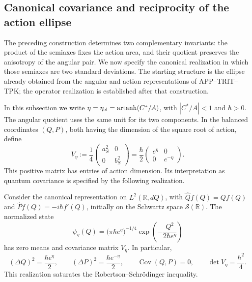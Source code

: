 
\subsection{Canonical covariance and reciprocity of the action ellipse}
\label{sec:ii-area-covarianza}

The preceding construction determines two complementary invariants:
the product of the semiaxes fixes the action area, and their quotient preserves
the anisotropy of the angular pair. We now specify the canonical realization
in which those semiaxes are two standard deviations. The starting
structure is the ellipse already obtained from the angular and action
representations of APP--TRIT--TPK; the operator realization is established
after that construction.

In this subsection we write \(\eta=\eta_{\rm el}
=\operatorname{artanh}(C^*/A)\), with \(|C^*/A|<1\) and
\(\hbar>0\). The angular quotient uses the same unit for its two
components. In the balanced coordinates \((Q,P)\), both having
the dimension of the square root of action, define
\begin{equation}
 V_\eta:=\frac14
 \begin{pmatrix}a_S^2&0\\0&b_S^2\end{pmatrix}
 =\frac{\hbar}{2}
 \begin{pmatrix}e^\eta&0\\0&e^{-\eta}\end{pmatrix}.
 \label{eq:ii-covarianza-geometrica}
\end{equation}
This positive matrix has entries of action dimension. Its interpretation
as quantum covariance is specified by the following realization.

\begin{proposition}
\label{prop:ii-covarianza-gaussiana}
Consider the canonical representation on \(L^2(\mathbb R,dQ)\), with
\(\widehat Qf(Q)=Qf(Q)\) and
\(\widehat Pf(Q)=-i\hbar f'(Q)\), initially on the Schwartz
space \(\mathcal S(\mathbb R)\). The normalized state
\begin{equation}
 \psi_\eta(Q)=\bigl(\pi\hbar e^\eta\bigr)^{-1/4}
 \exp\!\left(-\frac{Q^2}{2\hbar e^\eta}\right)
 \label{eq:ii-gaussiana-accion}
\end{equation}
has zero means and covariance matrix \(V_\eta\). In particular,
\begin{equation}
 (\Delta Q)^2=\frac{\hbar e^\eta}{2},\qquad
 (\Delta P)^2=\frac{\hbar e^{-\eta}}{2},\qquad
 \operatorname{Cov}(Q,P)=0,\qquad
 \det V_\eta=\frac{\hbar^2}{4}.
 \label{eq:ii-varianzas-accion}
\end{equation}
This realization saturates the Robertson--Schrödinger inequality.
\end{proposition}


